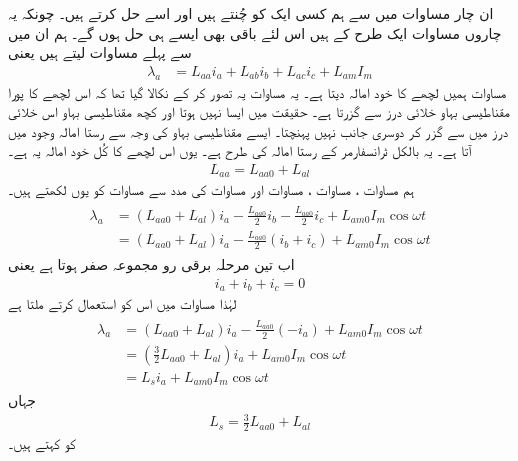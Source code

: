 ان چار مساوات میں سے ہم کسی ایک کو چُنتے ہیں اور اسے حل کرتے ہیں۔ چونکہ یہ چاروں مساوات ایک طرح کے ہیں اس لئے باقی بھی ایسے ہی حل ہوں گے۔ ہم ان میں سے پہلے مساوات لیتے ہیں یعنی
\begin{align}\label{مساوات_معاصر_ارتباط_الف_کل}
\lambda_a&=L_{aa} i_a+L_{ab} i_b +L_{ac} i_c+L_{am} I_m
\end{align}
 مساوات   ہمیں   لچھے کا خود امالہ دیتا ہے۔ یہ مساوات یہ تصور کر کے نکالا گیا تھا کہ اس لچھے کا پورا مقناطیسی بہاو خلائی درز سے گزرتا ہے۔ حقیقت میں ایسا نہیں ہوتا اور کچھ مقناطیسی بہاو اس خلائی درز میں سے گزر کر دوسری جانب نہیں پہنچتا۔ ایسے مقناطیسی بہاو کی وجہ سے رستا امالہ   وجود میں آتا ہے۔ یہ بالکل ٹرانسفارمر کے رستا امالہ کی طرح ہے۔ یوں اس لچھے کا کُل خود امالہ   یہ ہے۔
\begin{align}\label{مساوات_معاصر_الف_خود_کل_امالہ}
L_{aa}=L_{aa0}+L_{al}
\end{align}
ہم مساوات ،  مساوات ،  مساوات   اور مساوات   کی مدد سے مساوات   کو یوں لکھتے ہیں۔
\begin{gather}
\begin{aligned}\label{مساوات_معاصر_ارتباط_الف}
\lambda_a&=\left(L_{aa0}+L_{al} \right)i_a-\frac{L_{aa0}}{2} i_b -\frac{L_{aa0}}{2} i_c+L_{am0} I_m \cos \omega t \\
&=\left(L_{aa0}+L_{al} \right)i_a-\frac{L_{aa0}}{2} \left( i_b+i_c \right)+L_{am0} I_m \cos \omega t
\end{aligned}
\end{gather}
اب تین مرحلہ برقی رو مجموعہ صفر ہوتا ہے یعنی 
\begin{align}
i_a+i_b+i_c=0
\end{align}
لہٰذا مساوات   میں اس کو استعمال کرتے ملتا ہے
\begin{gather}
\begin{aligned}
\lambda_a&=\left(L_{aa0}+L_{al} \right)i_a-\frac{L_{aa0}}{2} \left( -i_a \right)+L_{am0} I_m \cos \omega t\\
&=\left(\frac{3}{2} L_{aa0}+L_{al} \right)i_a+L_{am0} I_m \cos \omega t\\
&=L_s i_a+L_{am0} I_m \cos \omega t
\end{aligned}
\end{gather}
جہاں
\begin{align}\label{مساوات_معاصر_معاصر_امالہ}
L_s=\frac{3}{2} L_{aa0}+L_{al}
\end{align}
کو  کہتے ہیں۔


